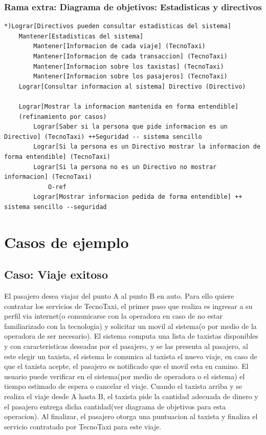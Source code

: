 \subsubsection{Rama extra: Diagrama de objetivos: Estadisticas y directivos}
\begin{lstlisting}
*)Lograr[Directivos pueden consultar estadisticas del sistema]
    Mantener[Estadisticas del sistema]
        Mantener[Informacion de cada viaje] (TecnoTaxi)
        Mantener[Informacion de cada transaccion] (TecnoTaxi)
        Mantener[Informacion sobre los taxistas] (TecnoTaxi)
        Mantener[Informacion sobre los pasajeros] (TecnoTaxi)
    Lograr[Consultar informacion al sistema] Directivo (Directivo)

    Lograr[Mostrar la informacion mantenida en forma entendible]
    (refinamiento por casos)
        Lograr[Saber si la persona que pide informacion es un Directivo] (TecnoTaxi) ++Seguridad -- sistema sencillo
        Lograr[Si la persona es un Directivo mostrar la informacion de forma entendible] (TecnoTaxi)
        Lograr[Si la persona no es un Directivo no mostrar informacion] (TecnoTaxi)
            O-ref
        Lograr[Mostrar informacion pedida de forma entendible] ++ sistema sencillo --seguridad

\end{lstlisting}

\section{Casos de ejemplo}
\subsection{Caso: Viaje exitoso}
El pasajero desea viajar del punto A al punto B en auto. Para ello quiere contratar los servicios de TecnoTaxi, el primer paso que realiza es ingresar a su perfil via internet(o comunicarse con la operadora en caso de no estar familiarizado con la tecnologia) y solicitar un movil al sistema(o por medio de la operadora de ser necesario). El sistema computa una lista de taxistas disponibles y con caracteristicas deseadas por el pasajero, y se las presenta al pasajero, al este elegir un taxista, el sistema le comunica al taxista el nuevo viaje, en caso de que el taxista acepte, el pasajero es notificado que el movil esta en camino. El usuario puede verificar en el sistema(por medio de operadora o el sistema) el tiempo estimado de espera o cancelar el viaje. Cuando el taxista arriba y se realiza el viaje desde A hasta B, el taxista pide la cantidad adecuada de dinero y el pasajero entrega dicha cantidad(ver diagrama de objetivos para esta operacion). Al finalizar, el pasajero otorga una puntuacion al taxista y finaliza el servicio contratado por TecnoTaxi para este viaje.

